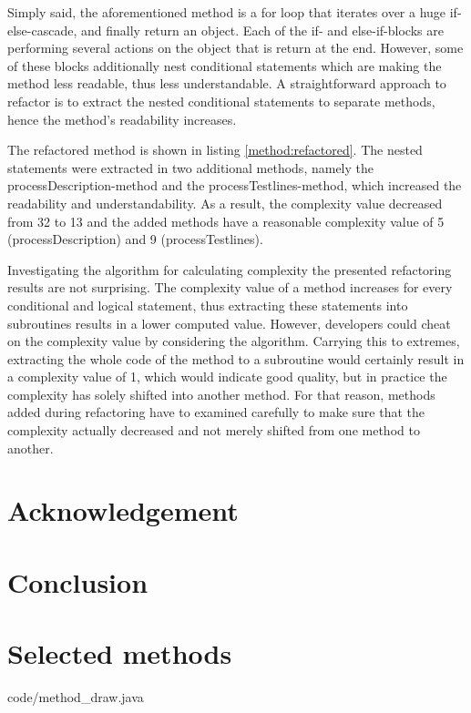 \documentclass[conference]{IEEEtran}
\newcommand{\lref}[1]{listing \ref{#1}}%
\begin{document}
Simply said, the aforementioned method is a for loop that iterates over a huge if-else-cascade, and finally return an object. Each of the if- and else-if-blocks are performing several actions on the object that is return at the end. However, some of these blocks additionally nest conditional statements which are making the method less readable, thus less understandable. A straightforward approach to refactor is to extract the nested conditional statements to separate methods, hence the method's readability increases. 

The refactored method is shown in \lref{method:refactored}. The nested statements were extracted in two additional methods, namely the processDescription-method and the processTestlines-method, which increased the readability and understandability. As a result, the complexity value decreased from 32 to 13 and the added methods have a reasonable complexity value of 5 (processDescription) and 9 (processTestlines). 

Investigating the algorithm for calculating complexity the presented refactoring results are not surprising. The complexity value of a method increases for every conditional and logical statement, thus extracting these statements into subroutines results in a lower computed value. However, developers could cheat on the complexity value by considering the algorithm. Carrying this to extremes, extracting the whole code of the method to a subroutine would certainly result in a complexity value of 1, which would indicate good quality, but in practice the complexity has solely shifted into another method. For that reason, methods added during refactoring have to examined carefully to make sure that the complexity actually decreased and not merely shifted from one method to another.

\section{Acknowledgement}

\section{Conclusion}

\appendix
\section{Selected methods}

{code/method_draw.java}
\end{document}
